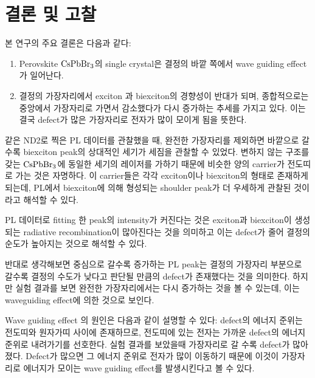 \newpage

\section{결론 및 고찰}
본 연구의 주요 결론은 다음과 같다:
\begin{enumerate}
	\item Perovskite $\rm CsPbBr_3$의 single crystal은 결정의 바깥 쪽에서 wave guiding effect가 일어난다.
	\item 결정의 가장자리에서 exciton 과 biexciton의 경향성이 반대가 되며, 종합적으로는 중앙에서 가장자리로 가면서 감소했다가 다시 증가하는 추세를 가지고 있다. 이는 결국 defect가 많은 가장자리로 전자가 많이 모이게 됨을 뜻한다.
\end{enumerate}
같은 ND2로 찍은 PL 데이터를 관찰했을 때, 완전한 가장자리를 제외하면 바깥으로 갈 수록 biexciton peak의 상대적인 세기가 세짐을 관찰할 수 있었다. 
변하지 않는 구조를 갖는 $\rm CsPbBr_3$에 동일한 세기의 레이저를 가하기 때문에 비슷한 양의 carrier가 전도띠로 가는 것은 자명하다. 이 carrier들은 각각 exciton이나 biexciton의 형태로 존재하게 되는데, PL에서 biexciton에 의해 형성되는 shoulder peak가 더 우세하게 관찰된 것이라고 해석할 수 있다. 

PL 데이터로 fitting 한 peak의 intensity가 커진다는 것은 exciton과 biexciton이 생성되는 radiative recombination이 많아진다는 것을 의미하고 이는 defect가 줄어 결정의 순도가 높아지는 것으로 해석할 수 있다.

반대로 생각해보면 중심으로 갈수록 증가하는 PL peak는 결정의 가장자리 부분으로 갈수록 결정의 수도가 낮다고 판단될 만큼의 defect가 존재했다는 것을 의미한다. 하지만 실험 결과를 보면 완전한 가장자리에서는 다시 증가하는 것을 볼 수 있는데, 이는 waveguiding effect에 의한 것으로 보인다. 

Wave guiding effect 의 원인은 다음과 같이 설명할 수 있다: defect의 에너지 준위는 전도띠와 원자가띠 사이에 존재하므로, 전도띠에 있는 전자는 가까운 defect의 에너지 준위로 내려가기를 선호한다. 실험 결과를 보았을때 가장자리로 갈 수록 defect가 많아졌다. Defect가 많으면 그 에너지 준위로 전자가 많이 이동하기 때문에 이것이 가장자리로 에너지가 모이는 wave guiding effect를 발생시킨다고 볼 수 있다. 
